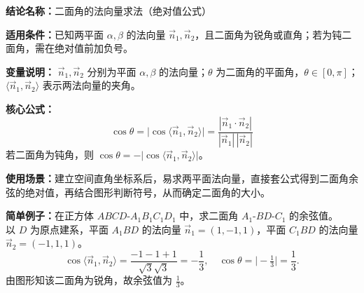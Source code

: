 \textbf{结论名称：}二面角的法向量求法（绝对值公式）

\textbf{适用条件：}已知两平面 \(\alpha,\beta\) 的法向量 \(\vec{n}_1,\vec{n}_2\)，且二面角为锐角或直角；若为钝二面角，需在绝对值前加负号。

\textbf{变量说明：} \(\vec{n}_1,\vec{n}_2\) 分别为平面 \(\alpha,\beta\) 的法向量；\(\theta\) 为二面角的平面角，\(\theta\in[0,\pi]\)；\(\langle\vec{n}_1,\vec{n}_2\rangle\) 表示两法向量的夹角。

\textbf{核心公式：}
\[
\boxed{\cos\theta = \bigl|\cos\langle\vec{n}_1,\vec{n}_2\rangle\bigr| 
      = \frac{|\vec{n}_1 \cdot \vec{n}_2|}{|\vec{n}_1|\,|\vec{n}_2|}}
\]
若二面角为钝角，则 \(\cos\theta = -\bigl|\cos\langle\vec{n}_1,\vec{n}_2\rangle\bigr|\)。

\textbf{使用场景：}建立空间直角坐标系后，易求两平面法向量，直接套公式得到二面角余弦的绝对值，再结合图形判断符号，从而确定二面角的大小。

\textbf{简单例子：}在正方体 \(ABCD\text{-}A_1B_1C_1D_1\) 中，求二面角 \(A_1\text{-}BD\text{-}C_1\) 的余弦值。\\
以 \(D\) 为原点建系，平面 \(A_1BD\) 的法向量 \(\vec{n}_1=(1,-1,1)\)，平面 \(C_1BD\) 的法向量 \(\vec{n}_2=(-1,1,1)\)。 
\[
\cos\langle\vec{n}_1,\vec{n}_2\rangle =\frac{-1-1+1}{\sqrt{3}\sqrt{3}}=-\frac{1}{3},
\quad \cos\theta =\bigl|-\tfrac{1}{3}\bigr|=\frac{1}{3}.
\]
由图形知该二面角为锐角，故余弦值为 \(\frac{1}{3}\)。